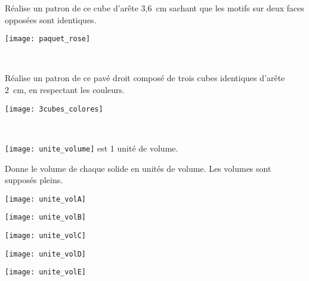 \begin{exercice}
\begin{minipage}[c]{0.66\linewidth}
\vspace{1cm}
Réalise un patron de ce cube d'arête 3,6 cm sachant que les motifs sur deux faces opposées sont identiques.
 \end{minipage} \hfill%
 \begin{minipage}[c]{0.28\linewidth}
\vspace{1cm}
  \texttt{[image: paquet\_rose]}
  \end{minipage} \\
\end{exercice}


\begin{exercice}
\begin{minipage}[c]{0.46\linewidth}
\vspace{1.9cm}
Réalise un patron de ce pavé droit composé de trois cubes identiques d'arête 2 cm, en respectant les couleurs.
 \end{minipage} \hfill%
 \begin{minipage}[c]{0.46\linewidth}
 \vspace{1cm}
  \texttt{[image: 3cubes\_colores]}
  \end{minipage} \\
\end{exercice}


\columnbreak



\begin{exercice}
\texttt{[image: unite\_volume]} est 1 unité de volume.

 Donne le volume de chaque solide en unités de volume. Les volumes sont supposés pleins.
\begin{colenumerate}{2}
 \item
 
 \texttt{[image: unite\_volA]} 
 
 \item
 
 \texttt{[image: unite\_volB]} 
 
 \item
 
 \texttt{[image: unite\_volC]} 
 
 \item
 
 \texttt{[image: unite\_volD]} 
 
 \item
 
 \texttt{[image: unite\_volE]} 
 \end{colenumerate}
\end{exercice}


